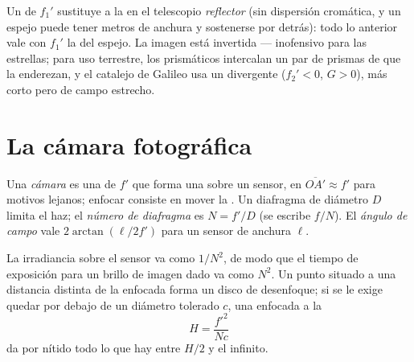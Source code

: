 \begin{remark}\label{rem:b1:optical-instruments:variants}
Un  de  $f_1'$ sustituye a la  
en el telescopio \emph{reflector} (sin dispersión cromática, y un espejo
puede tener metros de anchura y sostenerse por detrás): todo lo anterior
vale con $f_1'$ la  del espejo. La imagen está invertida
--- inofensivo para las estrellas; para uso terrestre, los prismáticos
intercalan un par de prismas de  que la enderezan, y el
catalejo de Galileo usa un  divergente ($f_2' < 0$, $G > 0$), más
corto pero de campo estrecho.
\end{remark}

\section{La cámara fotográfica}

\begin{definition}\label{def:b1:optical-instruments:camera}
Una \emph{cámara} es una  de  $f'$ que
forma una  sobre un sensor, en $\overline{OA'} \approx f'$ para
motivos lejanos; enfocar consiste en mover la . Un diafragma de
diámetro $D$ limita el haz; el \emph{número de diafragma} es $N = f'/D$
(se escribe $f/N$). El \emph{ángulo de campo} vale
$2\arctan(\ell/2f')$ para un sensor de anchura $\ell$.
\end{definition}

\begin{proposition}\label{prop:b1:optical-instruments:dof}
La irradiancia sobre el sensor va como $1/N^2$, de modo que el tiempo de
exposición para un brillo de imagen dado va como $N^2$. Un punto situado a
una distancia distinta de la enfocada forma un disco de desenfoque; si se
le exige quedar por debajo de un diámetro tolerado $c$, una  enfocada
a la \emph{}
\[
H = \frac{f'^2}{N c}
\]
da por nítido todo lo que hay entre $H/2$ y el infinito.
\end{proposition}

